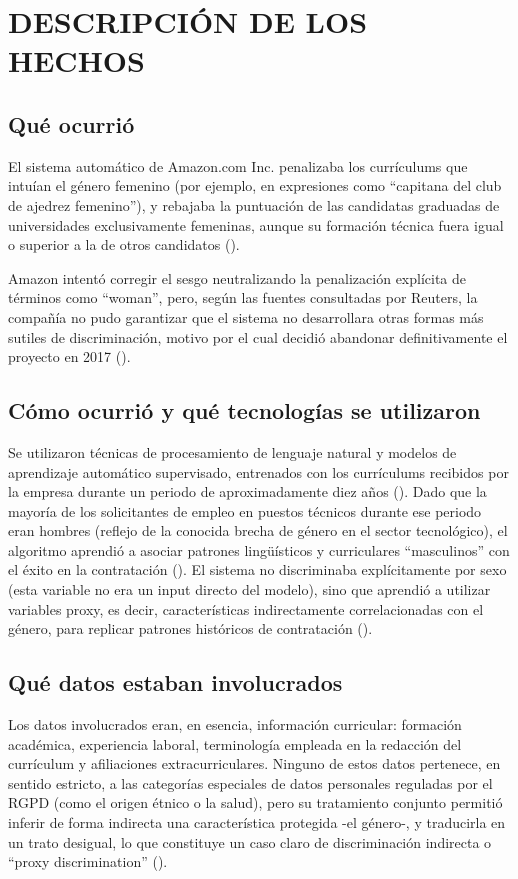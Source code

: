 \chapter{DESCRIPCIÓN DE LOS HECHOS}

\section{Qué ocurrió}
El sistema automático de Amazon.com Inc. penalizaba los currículums que intuían el género femenino (por ejemplo, en expresiones como ``capitana del club de ajedrez femenino''), y rebajaba la puntuación de las candidatas graduadas de universidades exclusivamente femeninas, aunque su formación técnica fuera igual o superior a la de otros candidatos (\textcite{dastin2018,infobae2018}).

Amazon intentó corregir el sesgo neutralizando la penalización explícita de términos como ``woman'', pero, según las fuentes consultadas por Reuters, la compañía no pudo garantizar que el sistema no desarrollara otras formas más sutiles de discriminación, motivo por el cual decidió abandonar definitivamente el proyecto en 2017 (\textcite{dastin2018}).

\section{Cómo ocurrió y qué tecnologías se utilizaron}
Se utilizaron técnicas de procesamiento de lenguaje natural y modelos de aprendizaje automático supervisado, entrenados con los currículums recibidos por la empresa durante un periodo de aproximadamente diez años (\textcite{dastin2018}). Dado que la mayoría de los solicitantes de empleo en puestos técnicos durante ese periodo eran hombres (reflejo de la conocida brecha de género en el sector tecnológico), el algoritmo aprendió a asociar patrones lingüísticos y curriculares ``masculinos'' con el éxito en la contratación (\textcite{chen2023}). El sistema no discriminaba explícitamente por sexo (esta variable no era un input directo del modelo), sino que aprendió a utilizar variables proxy, es decir, características indirectamente correlacionadas con el género, para replicar patrones históricos de contratación (\textcite{raghavan2020}).

\section{Qué datos estaban involucrados}
Los datos involucrados eran, en esencia, información curricular: formación académica, experiencia laboral, terminología empleada en la redacción del currículum y afiliaciones extracurriculares. Ninguno de estos datos pertenece, en sentido estricto, a las categorías especiales de datos personales reguladas por el RGPD (como el origen étnico o la salud), 
pero su tratamiento conjunto permitió inferir de forma indirecta una característica protegida -el género-, y traducirla en un trato desigual, lo que constituye un caso claro de discriminación indirecta o ``proxy discrimination'' (\textcite{kochling2020}).